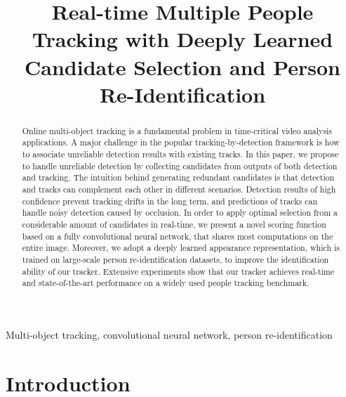 \documentclass{article}
\begin{document}
\sloppy

\def\x{{\mathbf x}}
\def\L{{\cal L}}


\title{Real-time Multiple People Tracking with Deeply Learned Candidate Selection and Person Re-Identification}
\address{
Tsinghua National Lab for Info. Sci. \& Tech. (TNList), \\
Department of Computer Science and Technology, Tsinghua University, Beijing, China, 100084. \\
l-chen16@mails.tsinghua.edu.cn
}



\maketitle


\begin{abstract}
Online multi-object tracking is a fundamental problem
in time-critical video analysis applications.
A major challenge in the popular tracking-by-detection framework is 
how to associate unreliable detection results with existing tracks.
In this paper, 
we propose to handle unreliable detection by
collecting candidates from outputs of both detection and tracking.
The intuition behind generating redundant candidates
is that detection and tracks can complement each other in different scenarios.
Detection results of high confidence prevent tracking drifts in the long term,
and predictions of tracks can handle noisy detection caused by occlusion.
In order to apply optimal selection from a considerable amount of candidates in real-time,
we present a novel scoring function based on a fully convolutional neural network,
that shares most computations on the entire image.
Moreover, we adopt a deeply learned appearance representation, 
which is trained on large-scale person re-identification datasets,
to improve the identification ability of our tracker.
Extensive experiments 
show that our tracker achieves real-time and state-of-the-art performance
on a widely used people tracking benchmark.


\end{abstract}
\begin{keywords}
Multi-object tracking, convolutional neural network, person re-identification
\end{keywords}
\section{Introduction}
\label{sec:intro}
\end{document}
